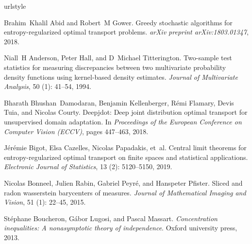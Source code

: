 \documentclass{article}
\theoremstyle{definition}
\begin{document}
\begin{thebibliography}{53}
\providecommand{\natexlab}[1]{#1}
\providecommand{\url}[1]{\texttt{#1}}
\expandafter\ifx\csname urlstyle\endcsname\relax
  \providecommand{\doi}[1]{doi: #1}\else
  \providecommand{\doi}{doi: \begingroup \urlstyle{rm}\Url}\fi

Brahim~Khalil Abid and Robert~M Gower.
\newblock Greedy stochastic algorithms for entropy-regularized optimal
  transport problems.
\newblock \emph{arXiv preprint arXiv:1803.01347}, 2018.

Niall~H Anderson, Peter Hall, and D~Michael Titterington.
\newblock Two-sample test statistics for measuring discrepancies between two
  multivariate probability density functions using kernel-based density
  estimates.
\newblock \emph{Journal of Multivariate Analysis}, 50 (1):
  41--54, 1994.

Bharath Bhushan~Damodaran, Benjamin Kellenberger, R{\'e}mi Flamary, Devis Tuia,
  and Nicolas Courty.
\newblock Deepjdot: Deep joint distribution optimal transport for unsupervised
  domain adaptation.
\newblock In \emph{Proceedings of the European Conference on Computer Vision
  (ECCV)}, pages 447--463, 2018.

J{\'e}r{\'e}mie Bigot, Elsa Cazelles, Nicolas Papadakis, et~al.
\newblock Central limit theorems for entropy-regularized optimal transport on
  finite spaces and statistical applications.
\newblock \emph{Electronic Journal of Statistics}, 13 (2):
  5120--5150, 2019.

Nicolas Bonneel, Julien Rabin, Gabriel Peyr{\'e}, and Hanspeter Pfister.
\newblock Sliced and radon wasserstein barycenters of measures.
\newblock \emph{Journal of Mathematical Imaging and Vision}, 51
  (1): 22--45, 2015.

St{\'e}phane Boucheron, G{\'a}bor Lugosi, and Pascal Massart.
\newblock \emph{Concentration inequalities: A nonasymptotic theory of
  independence}.
\newblock Oxford university press, 2013.


\end{thebibliography}
\end{document}
